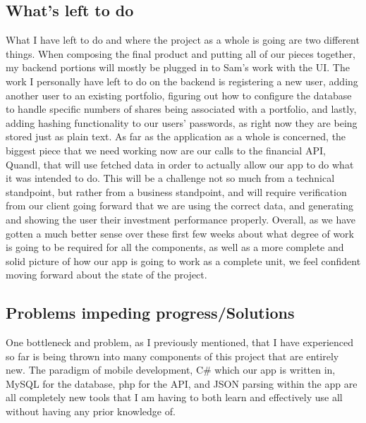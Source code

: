 \documentclass[letterpaper,10pt,titlepage,journal,compsoc,draftclsnofoot,onecolumn]{IEEEtran}
\begin{document}
\subsection{What's left to do}

What I have left to do and where the project as a whole is going are two different things. When composing the final product and putting all of our pieces together, my backend portions will mostly be plugged in to Sam's work with the UI. The work I personally have left to do on the backend is registering a new user, adding another user to an existing portfolio, figuring out how to configure the database to handle specific numbers of shares being associated with a portfolio, and lastly, adding hashing functionality to our users' passwords, as right now they are being stored just as plain text. As far as the application as a whole is concerned, the biggest piece that we need working now are our calls to the financial API, Quandl, that will use fetched data in order to actually allow our app to do what it was intended to do. This will be a challenge not so much from a technical standpoint, but rather from a business standpoint, and will require verification from our client going forward that we are using the correct data, and generating and showing the user their investment performance properly. Overall, as we have gotten a much better sense over these first few weeks about what degree of work is going to be required for all the components, as well as a more complete and solid picture of how our app is going to work as a complete unit, we feel confident moving forward about the state of the project.

\subsection{Problems impeding progress/Solutions}

One bottleneck and problem, as I previously mentioned, that I have experienced so far is being thrown into many components of this project that are entirely new. The paradigm of mobile development, C\# which our app is written in, MySQL for the database, php for the API, and JSON parsing within the app are all completely new tools that I am having to both learn and effectively use all without having any prior knowledge of.
\end{document}
